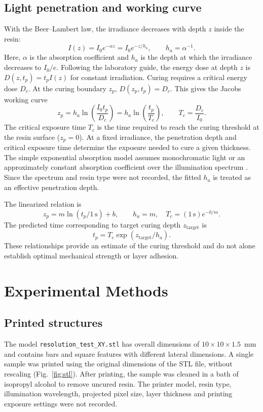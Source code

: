 \documentclass[10pt]{article}
\begin{document}
\subsection{Light penetration and working curve}
With the Beer--Lambert law, the irradiance decreases with depth $z$ inside the resin:
\begin{equation}
I(z)=I_0 e^{-\alpha z}=I_0e^{-z/h_a}, \qquad h_a=\alpha^{-1}.
\label{eq:beer}
\end{equation}
Here, $\alpha$ is the absorption coefficient and $h_a$ is the depth at which the irradiance decreases to $I_0/e$. Following the laboratory guide, the energy dose at depth $z$ is $D(z,t_p)=t_p I(z)$ for constant irradiation. Curing requires a critical energy dose $D_c$. At the curing boundary $z_p$, $D(z_p,t_p)=D_c$. This gives the Jacobs working curve \cite{vilnius2020mnft3,jacobs1992fundamentals}
\begin{equation}
z_p=h_a\ln\left(\frac{I_0t_p}{D_c}\right)
=h_a\ln\left(\frac{t_p}{T_c}\right), \qquad T_c=\frac{D_c}{I_0}.
\label{eq:working}
\end{equation}
The critical exposure time $T_c$ is the time required to reach the curing threshold at the resin surface ($z_p=0$). At a fixed irradiance, the penetration depth and critical exposure time determine the exposure needed to cure a given thickness. The simple exponential absorption model assumes monochromatic light or an approximately constant absorption coefficient over the illumination spectrum \cite{vilnius2020mnft3}. Since the spectrum and resin type were not recorded, the fitted $h_a$ is treated as an effective penetration depth.

The linearized relation is
\begin{equation}
z_p=m\ln(t_p/1\,\mathrm{s})+b, \qquad
h_a=m,\quad T_c=(1\,\mathrm{s})e^{-b/m}.
\label{eq:linear}
\end{equation}
The predicted time corresponding to target curing depth $z_{\mathrm{target}}$ is
\begin{equation}
t_p=T_c\exp(z_{\mathrm{target}}/h_a).
\label{eq:prediction}
\end{equation}
These relationships provide an estimate of the curing threshold and do not alone establish optimal mechanical strength or layer adhesion.

\section{Experimental Methods}
\subsection{Printed structures}
The model \texttt{resolution\_test\_XY.stl} has overall dimensions of $10\times10\times1.5$~mm and contains bars and square features with different lateral dimensions. A single sample was printed using the original dimensions of the STL file, without rescaling (Fig.~\ref{fig:stl}). After printing, the sample was cleaned in a bath of isopropyl alcohol to remove uncured resin. The printer model, resin type, illumination wavelength, projected pixel size, layer thickness and printing exposure settings were not recorded.
\end{document}
